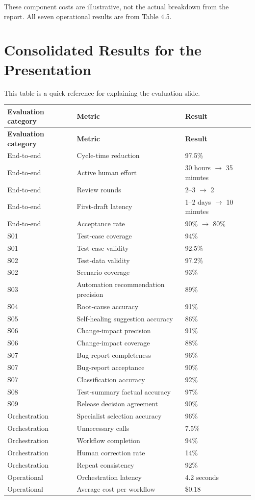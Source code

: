 \documentclass[11pt,a4paper]{article}
\begin{document}
These component costs are illustrative, not the actual breakdown from the report. All seven operational results are from Table 4.5.

\section{Consolidated Results for the Presentation}

This table is a quick reference for explaining the evaluation slide.

\small
\begin{longtable}{p{}p{}p{}}
\toprule
\textbf{Evaluation category} & \textbf{Metric} & \textbf{Result}\\
\midrule
\endfirsthead
\toprule
\textbf{Evaluation category} & \textbf{Metric} & \textbf{Result}\\
\midrule
\endhead
End-to-end & Cycle-time reduction & 97.5\%\\
End-to-end & Active human effort & 30 hours $\rightarrow$ 35 minutes\\
End-to-end & Review rounds & 2--3 $\rightarrow$ 2\\
End-to-end & First-draft latency & 1--2 days $\rightarrow$ 10 minutes\\
End-to-end & Acceptance rate & 90\% $\rightarrow$ 80\%\\
S01 & Test-case coverage & 94\%\\
S01 & Test-case validity & 92.5\%\\
S02 & Test-data validity & 97.2\%\\
S02 & Scenario coverage & 93\%\\
S03 & Automation recommendation precision & 89\%\\
S04 & Root-cause accuracy & 91\%\\
S05 & Self-healing suggestion accuracy & 86\%\\
S06 & Change-impact precision & 91\%\\
S06 & Change-impact coverage & 88\%\\
S07 & Bug-report completeness & 96\%\\
S07 & Bug-report acceptance & 90\%\\
S07 & Classification accuracy & 92\%\\
S08 & Test-summary factual accuracy & 97\%\\
S09 & Release decision agreement & 90\%\\
Orchestration & Specialist selection accuracy & 96\%\\
Orchestration & Unnecessary calls & 7.5\%\\
Orchestration & Workflow completion & 94\%\\
Orchestration & Human correction rate & 14\%\\
Orchestration & Repeat consistency & 92\%\\
Operational & Orchestration latency & 4.2 seconds\\
Operational & Average cost per workflow & \$0.18\\
\bottomrule
\end{longtable}
\normalsize
\end{document}
